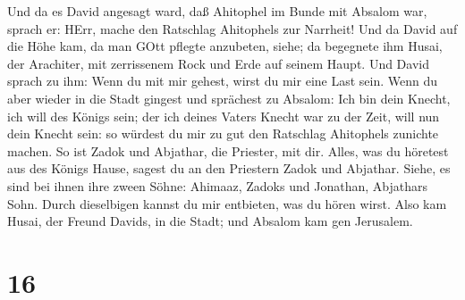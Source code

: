  Und da es David angesagt ward, daß Ahitophel im Bunde mit
Absalom war, sprach er: HErr, mache den Ratschlag Ahitophels zur
Narrheit!  Und da David auf die Höhe kam, da man GOtt
pflegte anzubeten, siehe; da begegnete ihm Husai, der Arachiter, mit
zerrissenem Rock und Erde auf seinem Haupt.  Und David
sprach zu ihm: Wenn du mit mir gehest, wirst du mir eine Last sein.
 Wenn du aber wieder in die Stadt gingest und sprächest zu
Absalom: Ich bin dein Knecht, ich will des Königs sein; der ich deines
Vaters Knecht war zu der Zeit, will nun dein Knecht sein: so würdest du
mir zu gut den Ratschlag Ahitophels zunichte machen.  So
ist Zadok und Abjathar, die Priester, mit dir. Alles, was du höretest
aus des Königs Hause, sagest du an den Priestern Zadok und Abjathar.
 Siehe, es sind bei ihnen ihre zween Söhne: Ahimaaz, Zadoks
und Jonathan, Abjathars Sohn. Durch dieselbigen kannst du mir entbieten,
was du hören wirst.  Also kam Husai, der Freund Davids, in
die Stadt; und Absalom kam gen Jerusalem.

\hypertarget{section-15}{%
\section{16}\label{section-15}}

